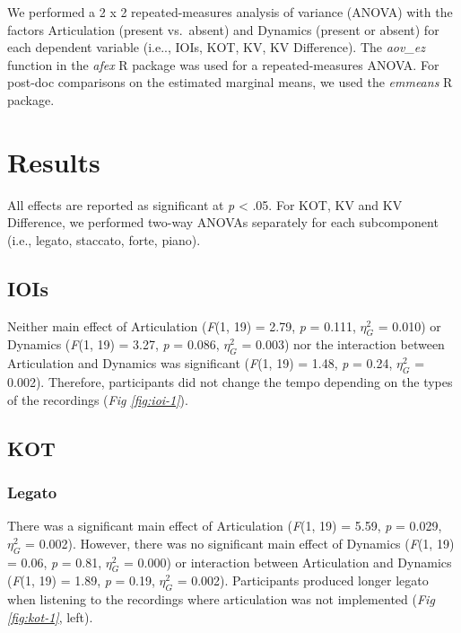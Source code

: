 \documentclass[
  man]{apa6}
\begin{document}
We performed a 2 x 2 repeated-measures analysis of variance (ANOVA) with the factors Articulation (present vs.~absent) and Dynamics (present or absent) for each dependent variable (i.e.., IOIs, KOT, KV, KV Difference). The \emph{aov\_ez} function in the \emph{afex} R package was used for a repeated-measures ANOVA. For post-doc comparisons on the estimated marginal means, we used the \emph{emmeans} R package.

\hypertarget{results}{%
\section{Results}\label{results}}

All effects are reported as significant at \emph{p} \textless{} .05. For KOT, KV and KV Difference, we performed two-way ANOVAs separately for each subcomponent (i.e., legato, staccato, forte, piano).

\hypertarget{iois}{%
\subsection{IOIs}\label{iois}}

Neither main effect of Articulation (\emph{F}(1, 19) = 2.79, \emph{p} = 0.111, \(\eta_G^2\) = 0.010) or Dynamics (\emph{F}(1, 19) = 3.27, \emph{p} = 0.086, \(\eta_G^2\) = 0.003) nor the interaction between Articulation and Dynamics was significant (\emph{F}(1, 19) = 1.48, \emph{p} = 0.24, \(\eta_G^2\) = 0.002). Therefore, participants did not change the tempo depending on the types of the recordings (\emph{Fig \ref{fig:ioi-1}}).

\hypertarget{kot}{%
\subsection{KOT}\label{kot}}

\hypertarget{legato}{%
\subsubsection{Legato}\label{legato}}

There was a significant main effect of Articulation (\emph{F}(1, 19) = 5.59, \emph{p} = 0.029, \(\eta_G^2\) = 0.002). However, there was no significant main effect of Dynamics (\emph{F}(1, 19) = 0.06, \emph{p} = 0.81, \(\eta_G^2\) = 0.000) or interaction between Articulation and Dynamics (\emph{F}(1, 19) = 1.89, \emph{p} = 0.19, \(\eta_G^2\) = 0.002). Participants produced longer legato when listening to the recordings where articulation was not implemented (\emph{Fig \ref{fig:kot-1}}, left).
\end{document}
